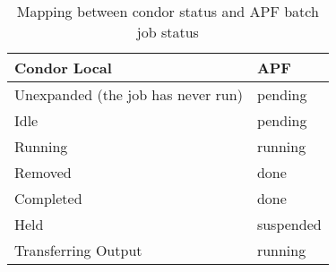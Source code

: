 \documentclass[a4paper]{jpconf}
\begin{document}



\begin{table}
   \begin{center}
      \begin{tabular}{l l}
         \hline
         \textbf{Condor Local}   & \textbf{APF}       \\ 
         \hline
         Unexpanded (the job has never run)    &  pending     \\
         Idle                                  &  pending     \\
         Running                               &  running     \\
         Removed                               &  done        \\
         Completed                             &  done        \\
         Held                                  &  suspended   \\
         Transferring Output                   &  running     \\
         \hline
      \end{tabular}
   \end{center}
   \caption{Mapping between condor status and APF batch job status}
   \label{translation}
\end{table}
\end{document}
